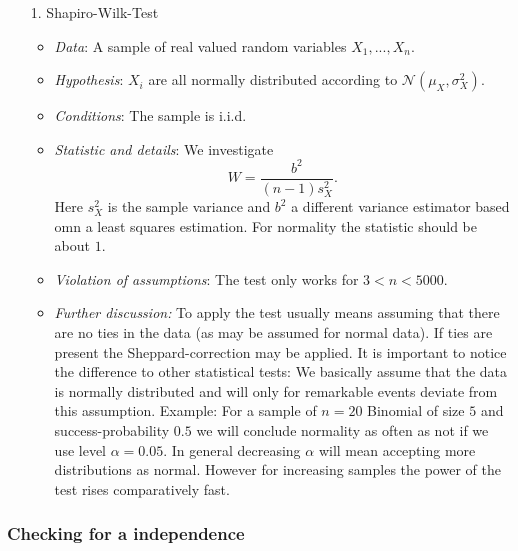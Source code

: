 \documentclass[12pt,a4paper]{amsart}
\theoremstyle{definition}
\theoremstyle{remark}
\numberwithin{equation}{section}
\begin{document}
\begin{itemize}
\item[1.] Shapiro-Wilk-Test
\begin{itemize}
\item \textit{Data}:  A sample of real valued random variables $X_1,...,X_n$.
\item \textit{Hypothesis}: $X_i$ are all normally distributed according to $\mathcal{N}(\mu_X, \sigma_X^2)$.
\item \textit{Conditions}: The sample is i.i.d.
\item \textit{Statistic and details}: We investigate
$$W=\frac{b^2}{(n-1)s_X^2}.$$
Here $s_X^2$ is the sample variance and $b^2$ a different variance estimator based omn a least squares estimation. For normality the statistic should be about $1$.
\item \textit{Violation of assumptions}:
The test only works for $3<n<5000$. 

\item \textit{Further discussion:} To apply the test usually means assuming that there are no ties in the data (as may be assumed for normal data). If ties are present the Sheppard-correction may be applied.  It is important to notice the difference to other statistical tests: We basically assume that the data is normally distributed and will only for remarkable events deviate from this assumption. Example: For a sample of $n=20$ Binomial of size $5$ and success-probability $0.5$ we will conclude normality as often as not if we use level $\alpha=0.05$. In general decreasing $\alpha$ will mean accepting more distributions as normal. However for increasing samples the power of the test rises comparatively fast. \\


\end{itemize}
\end{itemize}

\subsubsection{Checking for a independence}
\end{document}
